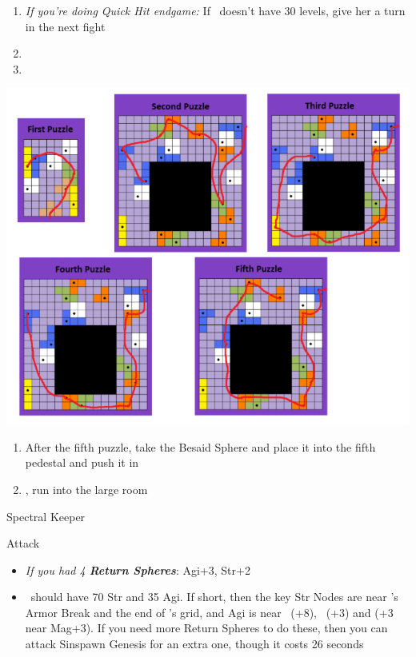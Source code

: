 \begin{multicols}{2}
\begin{enumerate}[resume]
	\item \textit{If you're doing Quick Hit endgame:} If \rikku\ doesn't have 30 levels, give her a turn in the next fight
	\item \formation{\tidus}{\yuna}{\auron}
	\item \save
\end{enumerate}
\includegraphics[scale=.8]{graphics/zanarkandpuzzles}
\begin{enumerate}[resume]
	\item After the fifth puzzle, take the Besaid Sphere and place it into the fifth pedestal and push it in
	\item \cs, run into the large room
\end{enumerate}
\begin{battle}[52000]{Spectral Keeper}
\begin{itemize}
	\summon{\bahamut}
	\bahamutf Attack
\end{itemize}
\end{battle}
\begin{spheregrid}
\begin{itemize}
	\item \textit{If you had 4 \textbf{Return Spheres}}: Agi+3, Str+2
	\item \yuna\ should have 70 Str and 35 Agi. If short, then the key Str Nodes are near \tidus's Armor Break and the end of \wakka's grid, and Agi is near \lulu\ (+8), \rikku\ (+3) and \wakka (+3 near Mag+3). If you need more Return Spheres to do these, then you can attack Sinspawn Genesis for an extra one, though it costs 26 seconds

\end{itemize}
\end{spheregrid}
\end{multicols}
